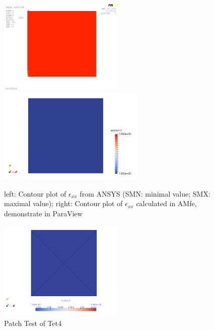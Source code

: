 \begin{figure}
	\begin{center}
		\includegraphics[width=6cm,clip]{PatchTest.png} 		
		\includegraphics[width=7cm,clip]{PatchParaView.pdf} 		
		\caption{left: Contour plot of $\epsilon_{xx}$ from ANSYS (SMN: minimal value; SMX: maximal value); right: Contour plot of $\epsilon_{xx}$ calculated in AMfe, demonstrate in ParaView} \label{fig: PatchTest}
	\end{center}
\end{figure}

\begin{figure}
	\begin{center}
		\includegraphics[width=6cm,clip]{Tet4Patch.pdf} 			
		\caption{Patch Test of Tet4} \label{fig: Tet4Patch}
	\end{center}
\end{figure}

